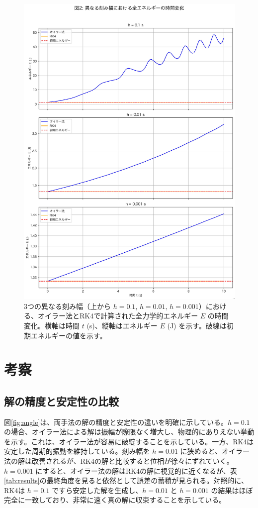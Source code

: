 \documentclass{article}
\begin{document}
\begin{figure}[htbp]
  \centering
  \includegraphics[width=\textwidth]{図2_エネルギーの時間変化.jpg}
  \caption{3つの異なる刻み幅（上から $h=0.1$, $h=0.01$, $h=0.001$）における、オイラー法とRK4で計算された全力学的エネルギー $E$ の時間変化。横軸は時間 $t$ (s)、縦軸はエネルギー $E$ (J) を示す。破線は初期エネルギーの値を示す。}
  \label{fig:energy}
\end{figure}

\clearpage

\section{考察}

\subsection{解の精度と安定性の比較}
図\ref{fig:angle}は、両手法の解の精度と安定性の違いを明確に示している。$h=0.1$ の場合、オイラー法による解は振幅が際限なく増大し、物理的にありえない挙動を示す。これは、オイラー法が容易に破綻することを示している。一方、RK4は安定した周期的振動を維持している。刻み幅を $h=0.01$ に狭めると、オイラー法の解は改善されるが、RK4の解と比較すると位相が徐々にずれていく。$h=0.001$ にすると、オイラー法の解はRK4の解に視覚的に近くなるが、表\ref{tab:results}の最終角度を見ると依然として誤差の蓄積が見られる。対照的に、RK4は $h=0.1$ ですら安定した解を生成し、$h=0.01$ と $h=0.001$ の結果はほぼ完全に一致しており、非常に速く真の解に収束することを示している。
\end{document}

